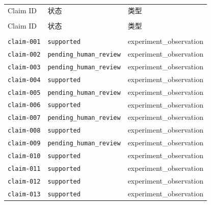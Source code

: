\documentclass[UTF8]{ctexart}
\begin{document}
\begin{longtable}{@{}>{\raggedright\arraybackslash}p{}>{\raggedright\arraybackslash}p{}>{\raggedright\arraybackslash}p{}@{}}
\toprule
Claim ID & 状态 & 类型\\\\
\midrule
\endfirsthead
\toprule
Claim ID & 状态 & 类型\\\\
\midrule
\endhead
\texttt{\scriptsize claim-\allowbreak{}001} & \texttt{\scriptsize supported} & experiment\_\allowbreak{}observation \\
\texttt{\scriptsize claim-\allowbreak{}002} & \texttt{\scriptsize pending\_\allowbreak{}human\_\allowbreak{}review} & experiment\_\allowbreak{}observation \\
\texttt{\scriptsize claim-\allowbreak{}003} & \texttt{\scriptsize pending\_\allowbreak{}human\_\allowbreak{}review} & experiment\_\allowbreak{}observation \\
\texttt{\scriptsize claim-\allowbreak{}004} & \texttt{\scriptsize supported} & experiment\_\allowbreak{}observation \\
\texttt{\scriptsize claim-\allowbreak{}005} & \texttt{\scriptsize pending\_\allowbreak{}human\_\allowbreak{}review} & experiment\_\allowbreak{}observation \\
\texttt{\scriptsize claim-\allowbreak{}006} & \texttt{\scriptsize supported} & experiment\_\allowbreak{}observation \\
\texttt{\scriptsize claim-\allowbreak{}007} & \texttt{\scriptsize pending\_\allowbreak{}human\_\allowbreak{}review} & experiment\_\allowbreak{}observation \\
\texttt{\scriptsize claim-\allowbreak{}008} & \texttt{\scriptsize supported} & experiment\_\allowbreak{}observation \\
\texttt{\scriptsize claim-\allowbreak{}009} & \texttt{\scriptsize pending\_\allowbreak{}human\_\allowbreak{}review} & experiment\_\allowbreak{}observation \\
\texttt{\scriptsize claim-\allowbreak{}010} & \texttt{\scriptsize supported} & experiment\_\allowbreak{}observation \\
\texttt{\scriptsize claim-\allowbreak{}011} & \texttt{\scriptsize supported} & experiment\_\allowbreak{}observation \\
\texttt{\scriptsize claim-\allowbreak{}012} & \texttt{\scriptsize supported} & experiment\_\allowbreak{}observation \\
\texttt{\scriptsize claim-\allowbreak{}013} & \texttt{\scriptsize supported} & experiment\_\allowbreak{}observation \\

\end{longtable}
\end{document}
